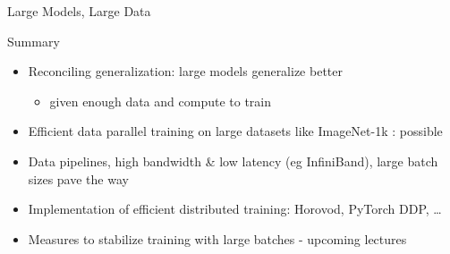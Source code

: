 \begin{frame}{Large Models, Large Data}
\protect\hypertarget{large-models-large-data}{}
\begin{block}{Summary}
\protect\hypertarget{summary-1}{}
\begin{itemize}
\tightlist
\item
  Reconciling generalization: large models generalize better

  \begin{itemize}
  \tightlist
  \item
    given enough data and compute to train
  \end{itemize}
\item
  Efficient data parallel training on large datasets like ImageNet-1k :
  possible
\item
  Data pipelines, high bandwidth \& low latency (eg InfiniBand), large
  batch sizes pave the way
\item
  Implementation of efficient distributed training: Horovod, PyTorch
  DDP, \ldots{}
\item
  Measures to stabilize training with large batches - upcoming lectures
\end{itemize}
\end{block}

\end{frame}
